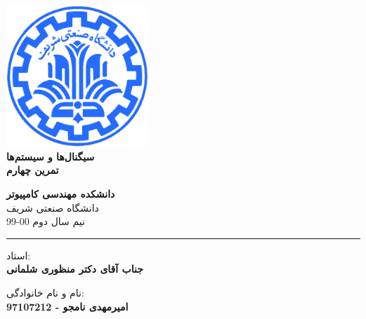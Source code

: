\documentclass[12pt]{article}
\begin{document}
\begin{titlepage}
\begin{center}
        
\vspace*{0.7cm}

\includegraphics[width=0.4\textwidth]{sharif1.png}\\
\vspace{0.5cm}
\textbf{ \Huge{\emph ‌سیگنال‌ها و سیستم‌ها} }\\
\vspace{0.5cm}
\textbf{ \Large{ تمرین چهارم} }
\vspace{0.2cm}
       
 
      \large \textbf{دانشکده مهندسی کامپیوتر}\\\vspace{0.2cm}
    \large   دانشگاه صنعتی شریف\\\vspace{0.2cm}
       \large   ﻧﯿﻢ سال دوم 00-99 \\\vspace{0.2cm}
      \noindent\rule[1ex]{\linewidth}{1pt}
استاد:\\
    \textbf{{جناب آقای دکتر منظوری شلمانی}}


    \vspace{0.15cm}
نام و نام خانوادگی:\\

       
    \textbf{{امیرمهدی نامجو - 97107212}}
\end{center}
\end{titlepage}


\newpage
\pagestyle{fancy}
\fancyhf{}
\fancyfoot{}
\cfoot{\thepage}
\end{document}
